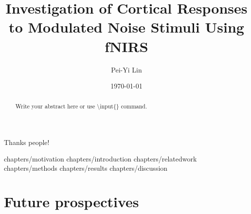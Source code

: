 \documentclass[a4paper, 12pt, twoside]{report}
\author{Pei-Yi Lin}
\title{Investigation of Cortical Responses to Modulated Noise Stimuli Using fNIRS}
\date{\today}
\begin{document}
\maketitle{}


\begin{abstract}
  Write your abstract here or use \textbackslash{}input\{\} command.

  
\end{abstract}
\cleardoublepage{}


\begin{acknowledgments}
Thanks people!
\end{acknowledgments}


% 



\cleardoublepage{}
\tableofcontents
\cleardoublepage{}



%

 {chapters/motivation}
 {chapters/introduction}
 {chapters/relatedwork}
 {chapters/methods}
 {chapters/results}
 {chapters/discussion}
\chapter{Future prospectives}

\appendix{}
%


\listoffigures{}
\listoftables{}




\nocite{*}
\cleardoublepage{}


\erklaerung{}
\end{document}
